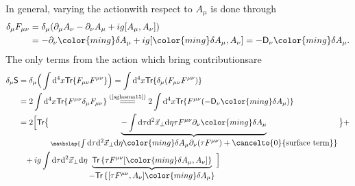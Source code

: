 \begin{note}
In general, varying the actionwith respect to $A_\mu$ is done through
\begin{equation}\label{sglasma15}
\begin{aligned}
    \delta_\mu F_{\mu\nu}&=\delta_\mu(\partial_\mu A_\nu-\partial_\nu A_\mu +ig[A_\mu,A_\nu])\\
    &=-\partial_\nu{\color{ming}\delta A_\mu}+ig[{\color{ming}\delta A_\mu},A_\nu]=-\textsf{D}_\nu{\color{ming}\delta A_\mu}.
\end{aligned}    
\end{equation}
The only terms from the action which bring contributionsare
\begin{align*}
    \delta_\mu\textsf{S}&=\delta_\mu\Big(\int\mathrm{d}^4x\textsf{Tr}\{F_{\mu\nu}F^{\mu\nu}\}\Big)=\int\mathrm{d}^4x\textsf{Tr}\{\delta_\mu(F_{\mu\nu}F^{\mu\nu})\}\\
    &=2\int\mathrm{d}^4x\textsf{Tr}\{F^{\mu\nu}\delta_\mu F_{\mu\nu}\}\stackrel{(\text{\cref{sglasma15}})}{=\joinrel=\joinrel=}2\int\mathrm{d}^4x\textsf{Tr}\{F^{\mu\nu}(-\textsf{D}_\nu{\color{ming}\delta A_\mu})\}\\
    &=2\Big[\textsf{Tr}\big\{\underbrace{-\int\mathrm{d}\tau\mathrm{d}^2\vec{x}_\perp\mathrm{d}\eta\tau F^{\mu\nu}\partial_\nu{\color{ming}\delta A_\mu}}_{\mathclap{\textstyle\int\mathrm{d}\tau\mathrm{d}^2\vec{x}_\perp\mathrm{d}\eta{\color{ming}\delta A_\mu} \partial_\nu(\tau F^{\mu\nu})+\cancelto{0}{\text{surface term}}}}\big\}+\\
    &\phantom{=}+ig\int\mathrm{d}\tau\mathrm{d}^2\vec{x}_\perp\mathrm{d}\eta\underbrace{\textsf{Tr}\left\{\tau F^{\mu \nu}[{\color{ming}\delta A_\mu},A_\nu]\right\}}_{\textstyle-\textsf{Tr}\left\{[\tau F^{\mu \nu},A_\nu]{\color{ming}\delta A_\mu}\right\}}\Big]\\

\end{align*}
\end{note}
